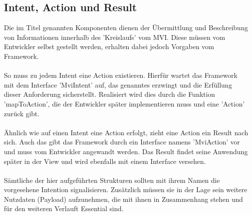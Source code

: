 \subsection{Intent, Action und Result}
Die im Titel genannten Komponenten dienen der Übermittlung und Beschreibung von Informationen innerhalb des 'Kreislaufs' vom MVI. Diese müssen vom Entwickler selbst gestellt werden, erhalten dabei jedoch Vorgaben vom Framework.
\\\\
So muss zu jedem Intent eine Action existieren. Hierfür wartet das Framework mit dem Interface 'MviIntent' auf, das genanntes erzwingt und die Erfüllung dieser Anforderung sicherstellt. Realisiert wird dies durch die Funktion 'mapToAction', die der Entwickler später implementieren muss und eine 'Action' zurück gibt.  
\\\\
Ähnlich wie auf einen Intent eine Action erfolgt, zieht eine Action ein Result nach sich. Auch das gibt das Framework durch ein Interface namens 'MviAction' vor und muss vom Entwickler angewandt werden. Das Result findet seine Anwendung später in der View und wird ebenfalls mit einem Interface versehen.
\\
\\
Sämtliche der hier aufgeführten Strukturen sollten mit ihrem Namen die vorgesehene Intention signalisieren. Zusätzlich müssen sie in der Lage sein weitere Nutzdaten (Payload) aufzunehmen, die mit ihnen in Zusammenhang stehen und für den weiteren Verlauft Essential sind.

